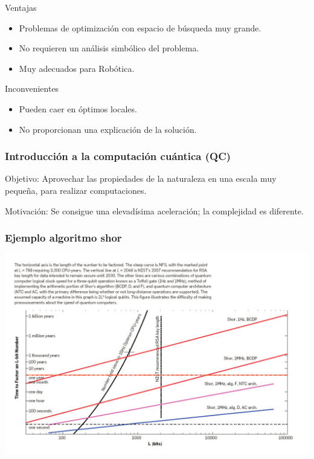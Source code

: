 \documentclass{beamer}
\begin{document}
\begin{frame}

\begin{block}{Ventajas}
\begin{itemize}
\item Problemas de optimización con espacio de búsqueda muy grande.
\item No requieren un análisis simbólico del problema.
\item Muy adecuados para Robótica.
\end{itemize}
\end{block}

\begin{block}{Inconvenientes}
\begin{itemize}
\item Pueden caer en óptimos locales.
\item No proporcionan una explicación de la solución.
\end{itemize}
\end{block}

\end{frame}
\begin{frame}
\frametitle{Introducción a la computación cuántica (QC)}
Objetivo: Aprovechar las propiedades de la naturaleza en una escala muy pequeña, 
para realizar computaciones.

Motivación: Se consigue una elevadísima aceleración; la complejidad es
diferente.

\end{frame}
\begin{frame}
\frametitle{Ejemplo algoritmo shor}
	\includegraphics[width=\textwidth]{shor}
\end{frame}
\end{document}
